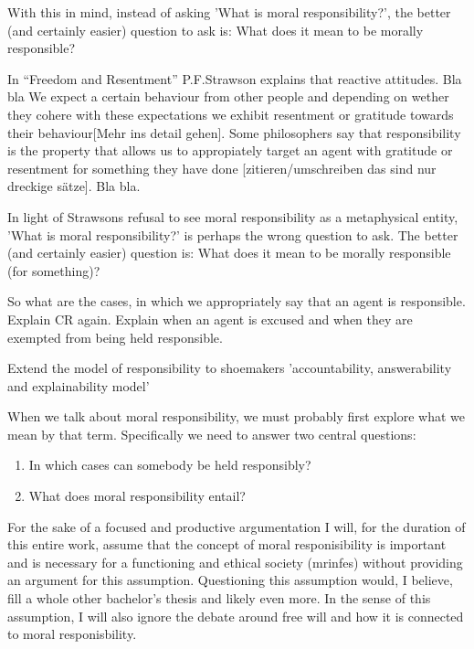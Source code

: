 \documentclass{article}
\begin{document}
With this in mind, instead of asking 'What is moral responsibility?', the better (and
certainly easier) question to ask is: What does it mean to be morally responsible?

In ``Freedom and Resentment'' P.F.Strawson explains that reactive attitudes. Bla
bla We expect a certain behaviour from other people and depending on wether they
cohere with these expectations we exhibit resentment or gratitude towards their
behaviour[Mehr ins detail gehen]. Some philosophers say that responsibility is
the property that allows us to appropiately target an agent with gratitude or
resentment for something they have done [zitieren/umschreiben das sind nur
dreckige sätze]. Bla bla.

In light of Strawsons refusal to see moral responsibility as a metaphysical
entity, 'What is moral responsibility?' is perhaps the wrong question to ask.
The better (and certainly easier) question is: What does it mean to be morally
responsible (for something)?

So what are the cases, in which we appropriately say that an agent is
responsible. Explain CR again. Explain when an agent is excused and when they
are exempted from being held responsible.

Extend the model of responsibility to shoemakers 'accountability, answerability
and explainability model'



When we talk about moral responsibility, we must probably first explore what we
mean by that term. Specifically we need to answer two central questions:\\

\begin{enumerate}
	\item In which cases can somebody be held responsibly?
	\item What does moral responsibility entail?
\end{enumerate}
For the sake of a focused and productive argumentation I will, for the duration
of this entire work, assume that the concept of moral responisibility is
important and is necessary for a functioning and ethical society
(\acrshort{mrinfes}) without
providing an argument for this assumption. Questioning this assumption would, I
believe, fill a whole other bachelor's thesis and likely even more. In the sense of
this assumption, I will also ignore the debate around free will and how it is
connected to moral responisbility.
\end{document}

